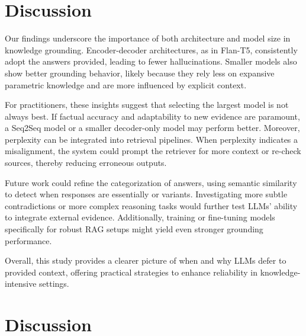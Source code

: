\section{Discussion}

Our findings underscore the importance of both architecture and model size in knowledge grounding. Encoder-decoder architectures, as in Flan-T5, consistently adopt the \Contextual{} answers provided, leading to fewer hallucinations. Smaller models also show better grounding behavior, likely because they rely less on expansive parametric knowledge and are more influenced by explicit context.

For practitioners, these insights suggest that selecting the largest model is not always best. If factual accuracy and adaptability to new evidence are paramount, a Seq2Seq model or a smaller decoder-only model may perform better. Moreover, perplexity can be integrated into retrieval pipelines. When perplexity indicates a misalignment, the system could prompt the retriever for more context or re-check sources, thereby reducing erroneous outputs.

Future work could refine the categorization of answers, using semantic similarity to detect when \Other{} responses are essentially \Parametric{} or \Contextual{} variants. Investigating more subtle contradictions or more complex reasoning tasks would further test LLMs’ ability to integrate external evidence. Additionally, training or fine-tuning models specifically for robust RAG setups might yield even stronger grounding performance.

Overall, this study provides a clearer picture of when and why LLMs defer to provided context, offering practical strategies to enhance reliability in knowledge-intensive settings.
\section{Discussion}

